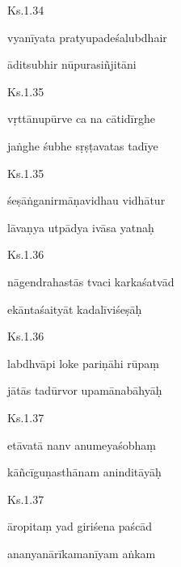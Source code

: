 \documentclass{tufte-handout}
\newenvironment{sanskrit}%
{\begin{otherlanguage}{sanskrit-devanagari}}%
{\end{otherlanguage}}
\begin{document}
    
	\begin{sanskrit}
	
	    
		Ks.1.34 
    
	    
		vyanīyata pratyupadeśalubdhair 
    
	    
		āditsubhir nūpurasiñjitāni 
    
	\end{sanskrit}

    
	\begin{sanskrit}
	
	    
		Ks.1.35 
    
	    
		vṛttānupūrve ca na cātidīrghe 
    
	    
		jaṅghe śubhe sṛṣṭavatas tadīye 
    
	\end{sanskrit}

    
	\begin{sanskrit}
	
	    
		Ks.1.35 
    
	    
		śeṣāṅganirmāṇavidhau vidhātur 
    
	    
		lāvaṇya utpādya ivāsa yatnaḥ 
    
	\end{sanskrit}

    
	\begin{sanskrit}
	
	    
		Ks.1.36 
    
	    
		nāgendrahastās tvaci karkaśatvād 
    
	    
		ekāntaśaityāt kadalīviśeṣāḥ 
    
	\end{sanskrit}

    
	\begin{sanskrit}
	
	    
		Ks.1.36 
    
	    
		labdhvāpi loke pariṇāhi rūpaṃ 
    
	    
		jātās tadūrvor upamānabāhyāḥ 
    
	\end{sanskrit}

    
	\begin{sanskrit}
	
	    
		Ks.1.37 
    
	    
		etāvatā nanv anumeyaśobhaṃ 
    
	    
		kāñcīguṇasthānam aninditāyāḥ 
    
	\end{sanskrit}

    
	\begin{sanskrit}
	
	    
		Ks.1.37 
    
	    
		āropitaṃ yad giriśena paścād 
    
	    
		ananyanārīkamanīyam aṅkam 
    
	\end{sanskrit}
\end{document}
